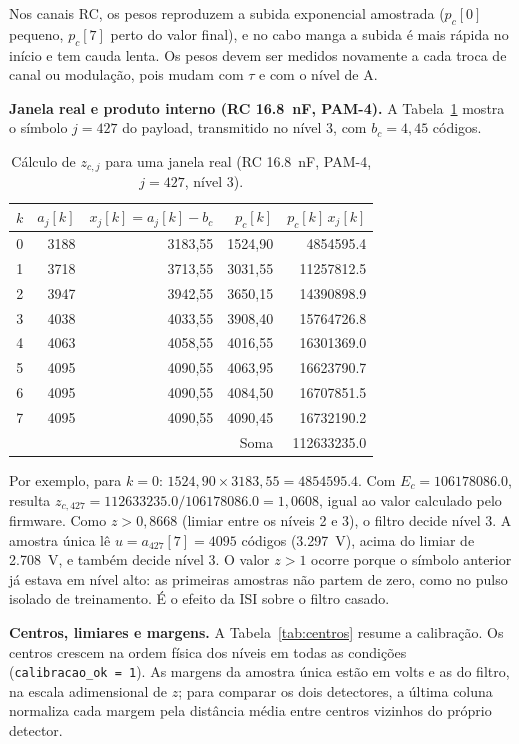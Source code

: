 \documentclass[12pt,a4paper]{article}
\begin{document}
Nos canais RC, os pesos reproduzem a subida exponencial amostrada ($p_c[0]$ pequeno, $p_c[7]$ perto
do valor final), e no cabo manga a subida é mais rápida no início e tem cauda lenta. Os pesos devem
ser medidos novamente a cada troca de canal ou modulação, pois mudam com $\tau$ e com o nível de A.

\textbf{Janela real e produto interno (RC \SI{16,8}{nF}, PAM-4).} A Tabela~\ref{tab:janela} mostra o
símbolo $j = 427$ do payload, transmitido no nível 3, com $b_c = 4{,}45$ códigos.

\begin{table}[H]
\centering
\caption{Cálculo de $z_{c,j}$ para uma janela real (RC \SI{16,8}{nF}, PAM-4, $j=427$, nível 3).}
\label{tab:janela}
\small
\begin{tabular}{c r r r r}
\toprule
$k$ & $a_j[k]$ & $x_j[k] = a_j[k]-b_c$ & $p_c[k]$ & $p_c[k]\,x_j[k]$ \\
\midrule
0 & 3188 & 3183,55 & 1524,90 & \num{4854595.4} \\
1 & 3718 & 3713,55 & 3031,55 & \num{11257812.5} \\
2 & 3947 & 3942,55 & 3650,15 & \num{14390898.9} \\
3 & 4038 & 4033,55 & 3908,40 & \num{15764726.8} \\
4 & 4063 & 4058,55 & 4016,55 & \num{16301369.0} \\
5 & 4095 & 4090,55 & 4063,95 & \num{16623790.7} \\
6 & 4095 & 4090,55 & 4084,50 & \num{16707851.5} \\
7 & 4095 & 4090,55 & 4090,45 & \num{16732190.2} \\
\midrule
\multicolumn{4}{r}{Soma} & \num{112633235.0} \\
\bottomrule
\end{tabular}
\end{table}

Por exemplo, para $k=0$: $1524{,}90 \times 3183{,}55 = \num{4854595.4}$. Com
$E_c = \num{106178086.0}$, resulta $z_{c,427} = \num{112633235.0}/\num{106178086.0} = 1{,}0608$,
igual ao valor calculado pelo firmware. Como $z > 0{,}8668$ (limiar entre os níveis 2 e 3), o
filtro decide nível 3. A amostra única lê $u = a_{427}[7] = 4095$ códigos (\SI{3,297}{V}), acima do
limiar de \SI{2,708}{V}, e também decide nível 3. O valor $z>1$ ocorre porque o símbolo anterior
já estava em nível alto: as primeiras amostras não partem de zero, como no pulso isolado de treinamento.
É o efeito da ISI sobre o filtro casado.

\textbf{Centros, limiares e margens.} A Tabela~\ref{tab:centros} resume a calibração. Os centros
crescem na ordem física dos níveis em todas as condições (\texttt{calibracao\_ok\,=\,1}). As margens
da amostra única estão em volts e as do filtro, na escala adimensional de $z$; para comparar os dois
detectores, a última coluna normaliza cada margem pela distância média entre centros vizinhos do
próprio detector.
\end{document}
